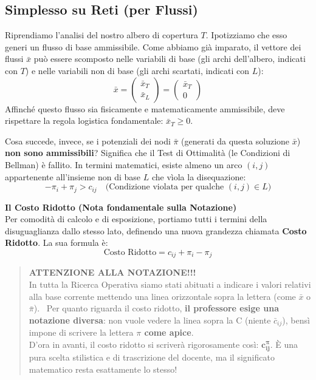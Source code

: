 \documentclass[12pt, a4paper]{article}
\begin{document}
	\subsection*{Simplesso su Reti (per Flussi)}
	
	\vspace{0.2cm}
	Riprendiamo l'analisi del nostro albero di copertura $T$. Ipotizziamo che esso generi un flusso di base ammissibile. Come abbiamo già imparato, il vettore dei flussi $\bar{x}$ può essere scomposto nelle variabili di base (gli archi dell'albero, indicati con $T$) e nelle variabili non di base (gli archi scartati, indicati con $L$):
	\[
	\bar{x} = \begin{pmatrix} \bar{x}_T \\ \bar{x}_L \end{pmatrix} = \begin{pmatrix} \bar{x}_T \\ 0 \end{pmatrix}
	\]
	Affinché questo flusso sia fisicamente e matematicamente ammissibile, deve rispettare la regola logistica fondamentale: $\bar{x}_T \geq 0$.
	
	Cosa succede, invece, se i potenziali dei nodi $\bar{\pi}$ (generati da questa soluzione $\bar{x}$) \textbf{non sono ammissibili}?
	Significa che il Test di Ottimalità (le Condizioni di Bellman) è fallito. In termini matematici, esiste almeno un arco $(i,j)$ appartenente all'insieme non di base $L$ che vìola la disequazione:
	\[
	-\pi_i + \pi_j > c_{ij} \quad \text{(Condizione violata per qualche } (i,j) \in L)
	\]
	
	\vspace{0.4cm}
	\textbf{Il Costo Ridotto (Nota fondamentale sulla Notazione)}\\
	Per comodità di calcolo e di esposizione, portiamo tutti i termini della disuguaglianza dallo stesso lato, definendo una nuova grandezza chiamata \textbf{Costo Ridotto}. La sua formula è:
	\[
	\text{Costo Ridotto} = c_{ij} + \pi_i - \pi_j
	\]
	\begin{quote}
		\textbf{ATTENZIONE ALLA NOTAZIONE!!!}\\
		In tutta la Ricerca Operativa siamo stati abituati a indicare i valori relativi alla base corrente mettendo una linea orizzontale sopra la lettera (come $\bar{x}$ o $\bar{\pi}$). 
		Per quanto riguarda il costo ridotto, \textbf{il professore esige una notazione diversa}: non vuole vedere la linea sopra la C (niente $\bar{c}_{ij}$), bensì impone di scrivere la lettera \textbf{$\pi$ come apice}. \\
		D'ora in avanti, il costo ridotto si scriverà rigorosamente così: $\mathbf{c_{ij}^\pi}$. È una pura scelta stilistica e di trascrizione del docente, ma il significato matematico resta esattamente lo stesso!
	\end{quote}
	
\end{document}
